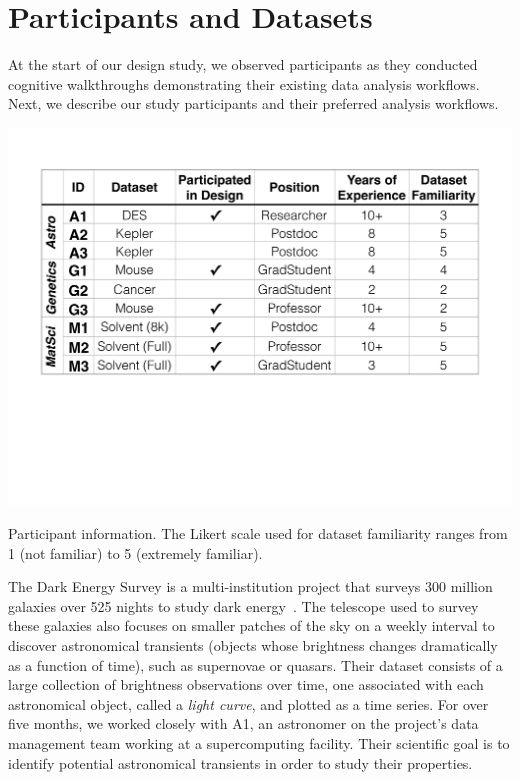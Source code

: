 \section{Participants and Datasets\label{sec:participantdatasets}}
At the start of our design study, we observed participants as they conducted cognitive walkthroughs demonstrating their existing data analysis workflows. Next, we describe our study participants and their preferred analysis workflows.%
\begin{table}[h!]
  \centering
  \vspace{-10pt}
  \includegraphics[width=\linewidth]{figures/participant_info.pdf}
  \caption{Participant information. The Likert scale used for dataset familiarity ranges from 1 (not familiar) to 5 (extremely familiar).}
  \label{participants}
  \vspace{-15pt}
\end{table}
\par\noindent{} The Dark Energy Survey is a multi-institution project that surveys 300 million galaxies over 525 nights to study dark energy~\cite{Drlica-Wagner2017}. The telescope used to survey these galaxies also focuses on smaller patches of the sky on a weekly interval to discover astronomical transients (objects whose brightness changes dramatically as a function of time), such as supernovae or quasars. Their dataset consists of a large collection of brightness observations over time, one associated with each astronomical object, called a {\em light curve}, and plotted as a time series. For over five months, we worked closely with A1, an astronomer on the project's data management team working at a supercomputing facility. Their scientific goal is to identify potential astronomical transients in order to study their properties. 
